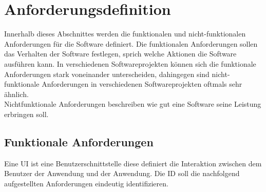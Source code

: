 \section{Anforderungsdefinition}
\label{sec:anforderungsdefinition}
Innerhalb dieses Abschnittes werden die funktionalen und nicht-funktionalen Anforderungen für die Software definiert. Die funktionalen Anforderungen sollen das Verhalten der Software festlegen, sprich welche Aktionen die Software ausführen kann. In verschiedenen Softwareprojekten können sich die funktionale Anforderungen stark voneinander unterscheiden, dahingegen sind nicht-funktionale Anforderungen in verschiedenen Softwareprojekten oftmals sehr ähnlich.\\ 
Nichtfunktionale Anforderungen beschreiben wie gut eine Software seine Leistung erbringen soll.

\subsection{Funktionale Anforderungen}

Eine \ac{UI} ist eine Benutzerschnittstelle diese definiert die Interaktion zwischen dem Benutzer der Anwendung und der Anwendung. Die \ac{ID} soll die nachfolgend aufgestellten Anforderungen eindeutig identifizieren.

